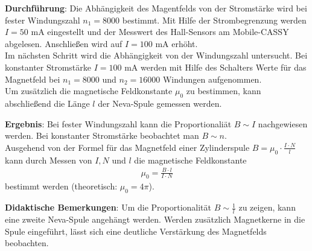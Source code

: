 \documentclass[../main.tex]{subfiles}
\begin{document}
\begin{tcolorbox}
    \vspace{0.4cm}
    \textbf{Durchführung}: Die Abhängigkeit des Magentfelds von der Stromstärke wird bei fester Windungszahl $n_1=8000$ bestimmt. Mit Hilfe der Strombegrenzung werden $I=50$ mA eingestellt und der Messwert des Hall-Sensors am Mobile-CASSY abgelesen. Anschließen wird auf $I=100$ mA erhöht.\\
    Im nächsten Schritt wird die Abhängigkeit von der Windungszahl untersucht. Bei konstanter Stromstärke $I=100$ mA werden mit Hilfe des Schalters Werte für das Magnetfeld bei $n_1=8000$ und $n_2=16000$ Windungen aufgenommen.\\
    Um zusätzlich die magnetische Feldkonstante $\mu_0$ zu bestimmen, kann abschließend die Länge $l$ der Neva-Spule gemessen werden.

    \vspace{0.4cm}
    \textbf{Ergebnis}: Bei fester Windungszahl kann die Proportionaliät $B \sim I$ nachgewiesen werden. Bei konstanter Stromstärke beobachtet man $B \sim n$.\\
    Ausgehend von der Formel für das Magnetfeld einer Zylinderspule $B=\mu_0 \cdot \frac{I \cdot N}{l}$ kann durch Messen von $I,N$ und $l$ die magnetische Feldkonstante 
    \begin{align*}
        \mu_0 = \frac{B \cdot l}{I \cdot N}
    \end{align*}
    bestimmt werden (theoretisch: $\mu_0=4\pi$).

    \vspace{0.4cm}
    \textbf{Didaktische Bemerkungen}: Um die Proportionalität $B \sim \frac{1}{l}$ zu zeigen, kann eine zweite Neva-Spule angehängt werden. Werden zusätzlich Magnetkerne in die Spule eingeführt, lässt sich eine deutliche Verstärkung des Magnetfelds beobachten.


\end{tcolorbox}
\end{document}
